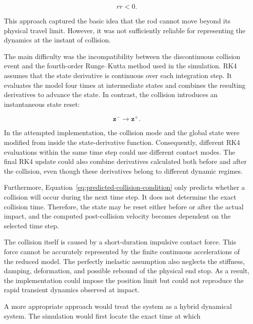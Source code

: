 \begin{equation}
r\ddot{r}<0.
\label{eq:implemented-release-condition}
\end{equation}

This approach captured the basic idea that the rod cannot move beyond its physical travel limit. However, it was not sufficiently reliable for representing the dynamics at the instant of collision.

The main difficulty was the incompatibility between the discontinuous collision event and the fourth-order Runge--Kutta method used in the simulation. RK4 assumes that the state derivative is continuous over each integration step. It evaluates the model four times at intermediate states and combines the resulting derivatives to advance the state. In contrast, the collision introduces an instantaneous state reset:

\begin{equation}
\mathbf{z}^{-}
\longrightarrow
\mathbf{z}^{+}.
\end{equation}

In the attempted implementation, the collision mode and the global state were modified from inside the state-derivative function. Consequently, different RK4 evaluations within the same time step could use different contact modes. The final RK4 update could also combine derivatives calculated both before and after the collision, even though these derivatives belong to different dynamic regimes.

Furthermore, Equation~\eqref{eq:predicted-collision-condition} only predicts whether a collision will occur during the next time step. It does not determine the exact collision time. Therefore, the state may be reset either before or after the actual impact, and the computed post-collision velocity becomes dependent on the selected time step.

The collision itself is caused by a short-duration impulsive contact force. This force cannot be accurately represented by the finite continuous accelerations of the reduced model. The perfectly inelastic assumption also neglects the stiffness, damping, deformation, and possible rebound of the physical end stop. As a result, the implementation could impose the position limit but could not reproduce the rapid transient dynamics observed at impact.

A more appropriate approach would treat the system as a hybrid dynamical system. The simulation would first locate the exact time at which

